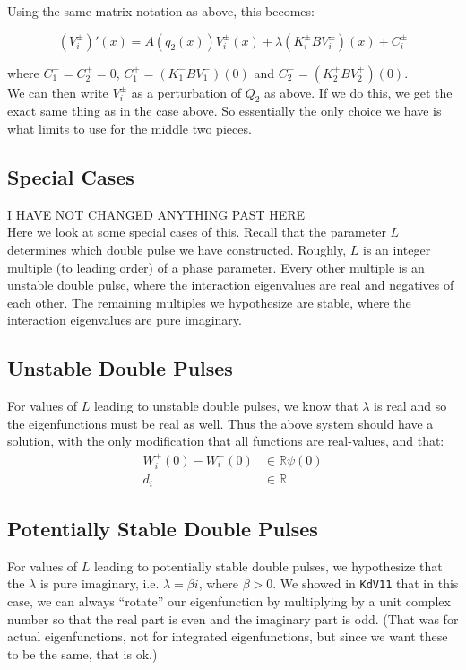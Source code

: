 \documentclass[12pt]{article}
\def\R{{\mathbb R}}
\begin{document}
Using the same matrix notation as above, this becomes:

\[
(V_i^\pm)'(x) = A(q_2(x)) V_i^\pm(x) + \lambda (K_i^\pm B V_i^\pm)(x) + C_i^\pm
\]

where $C_1^- = C_2^+ = 0$, $C_1^+ = (K_1^- B V_1^-)(0)$ and $C_2^- = (K_2^+ B V_2^+)(0)$.\\ 

We can then write $V_i^\pm$ as a perturbation of $Q_2$ as above. If we do this, we get the exact same thing as in the case above. So essentially the only choice we have is what limits to use for the middle two pieces. 

\subsection*{Special Cases}

I HAVE NOT CHANGED ANYTHING PAST HERE \\

Here we look at some special cases of this. Recall that the parameter $L$ determines which double pulse we have constructed. Roughly, $L$ is an integer multiple (to leading order) of a phase parameter. Every other multiple is an unstable double pulse, where the interaction eigenvalues are real and negatives of each other. The remaining multiples we hypothesize are stable, where the interaction eigenvalues are pure imaginary.\\

\subsection*{Unstable Double Pulses}
For values of $L$ leading to unstable double pulses, we know that $\lambda$ is real and so the eigenfunctions must be real as well. Thus the above system should have a solution, with the only modification that all functions are real-values, and that:
\begin{align*}
W_i^+(0) - W_i^-(0) &\in \R \psi(0) \\
d_i &\in \R
\end{align*}

\subsection*{Potentially Stable Double Pulses}
For values of $L$ leading to potentially stable double pulses, we hypothesize that the $\lambda$ is pure imaginary, i.e. $\lambda = \beta i$, where $\beta > 0$. We showed in \texttt{KdV11} that in this case, we can always ``rotate'' our eigenfunction by multiplying by a unit complex number so that the real part is even and the imaginary part is odd. (That was for actual eigenfunctions, not for integrated eigenfunctions, but since we want these to be the same, that is ok.)\\
\end{document}
